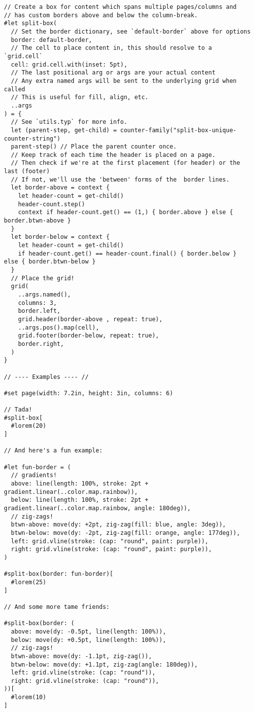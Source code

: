 \begin{verbatim}
// Create a box for content which spans multiple pages/columns and
// has custom borders above and below the column-break.
#let split-box(
  // Set the border dictionary, see `default-border` above for options
  border: default-border,
  // The cell to place content in, this should resolve to a `grid.cell`
  cell: grid.cell.with(inset: 5pt),
  // The last positional arg or args are your actual content
  // Any extra named args will be sent to the underlying grid when called
  // This is useful for fill, align, etc.
  ..args
) = {
  // See `utils.typ` for more info.
  let (parent-step, get-child) = counter-family("split-box-unique-counter-string")
  parent-step() // Place the parent counter once.
  // Keep track of each time the header is placed on a page.
  // Then check if we're at the first placement (for header) or the last (footer)
  // If not, we'll use the 'between' forms of the  border lines.
  let border-above = context {
    let header-count = get-child()
    header-count.step()
    context if header-count.get() == (1,) { border.above } else { border.btwn-above }
  }
  let border-below = context {
    let header-count = get-child()
    if header-count.get() == header-count.final() { border.below } else { border.btwn-below }
  }
  // Place the grid!
  grid(
    ..args.named(),
    columns: 3,
    border.left,
    grid.header(border-above , repeat: true),
    ..args.pos().map(cell),
    grid.footer(border-below, repeat: true),
    border.right,
  )
}

// ---- Examples ---- //

#set page(width: 7.2in, height: 3in, columns: 6)

// Tada!
#split-box[
  #lorem(20)
]

// And here's a fun example:

#let fun-border = (
  // gradients!
  above: line(length: 100%, stroke: 2pt + gradient.linear(..color.map.rainbow)),
  below: line(length: 100%, stroke: 2pt + gradient.linear(..color.map.rainbow, angle: 180deg)),
  // zig-zags!
  btwn-above: move(dy: +2pt, zig-zag(fill: blue, angle: 3deg)),
  btwn-below: move(dy: -2pt, zig-zag(fill: orange, angle: 177deg)),
  left: grid.vline(stroke: (cap: "round", paint: purple)),
  right: grid.vline(stroke: (cap: "round", paint: purple)),
)

#split-box(border: fun-border)[
  #lorem(25)
]

// And some more tame friends:

#split-box(border: (
  above: move(dy: -0.5pt, line(length: 100%)),
  below: move(dy: +0.5pt, line(length: 100%)),
  // zig-zags!
  btwn-above: move(dy: -1.1pt, zig-zag()),
  btwn-below: move(dy: +1.1pt, zig-zag(angle: 180deg)),
  left: grid.vline(stroke: (cap: "round")),
  right: grid.vline(stroke: (cap: "round")),
))[
  #lorem(10)
]


\end{verbatim}

